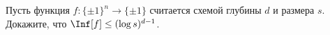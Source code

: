 Пусть функция $f\colon \{\pm 1\}^n \to \{\pm 1\}$ считается схемой глубины $d$ и размера $s$. Докажите,
что $\Inf[f] \le (\log s)^{d - 1}$.